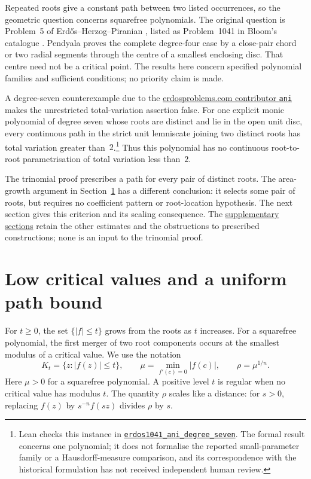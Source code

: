 \documentclass[11pt]{article}
\begin{document}
Repeated roots give a constant path between two listed occurrences, so the
geometric question concerns squarefree polynomials.  The original question
is Problem~5 of Erd\H{o}s--Herzog--Piranian \cite[Problem~5, p.~139]{ehp1958},
listed as Problem~1041 in Bloom's catalogue \cite{bloom}.
Pendyala \cite[Theorem~1 and Lemma~1, pp.~1--3]{june2026} proves the
complete degree-four case by a close-pair chord or two radial segments
through the centre of a smallest enclosing disc. That centre need not be
a critical point. The results here concern specified polynomial families
and sufficient conditions; no priority claim is made.

\label{res:ani-degree-seven-counterexample}
A degree-seven counterexample due to the
\href{https://www.erdosproblems.com/1041}{erdosproblems.com contributor \texttt{ani}} makes the unrestricted total-variation assertion false.  For
one explicit monic polynomial of degree seven whose roots are distinct and
lie in the open unit disc, every continuous path in the strict unit lemniscate
joining two distinct roots has total variation greater than~$2$.\footnote{Lean
checks this instance in
\href{https://github.com/wcook04/plectis-erdos/blob/f70679d47178bf1174309cb29f5b31748609cc04/lean/ErdosProblems/Erdos1041/Counterexample/CatalogueAdapter.lean\#L25}{\texttt{erdos1041\_ani\_degree\_seven}}.
The formal result concerns one polynomial; it does not formalise the reported
small-parameter family or a Hausdorff-measure comparison, and its correspondence
with the historical formulation has not received independent human review.}
Thus this polynomial has no continuous root-to-root parametrisation of total variation less than~$2$.

The trinomial proof prescribes a path for every pair of distinct roots.
The area-growth argument in Section~\ref{sec:constant-factor} has a
different conclusion: it selects some pair of roots, but requires no
coefficient pattern or root-location hypothesis. The next section gives
this criterion and its scaling consequence. The
\hyperlink{supplementary-results}{supplementary sections} retain the
other estimates and the obstructions to prescribed constructions;
none is an input to the trinomial proof.

\section{Low critical values and a uniform path bound}
\label{sec:constant-factor}

For $t\ge0$, the set $\{|f|\le t\}$ grows from the roots as $t$ increases.
For a squarefree polynomial, the first merger of two root components occurs
at the smallest modulus of a critical value. We use the notation
\[
 K_t=\{z:|f(z)|\le t\},\qquad
 \mu=\min_{f'(c)=0}|f(c)|,\qquad \rho=\mu^{1/n}.
\]
Here $\mu>0$ for a squarefree polynomial. A positive level $t$ is
regular when no critical value has modulus $t$. The quantity $\rho$ scales
like a distance: for $s>0$, replacing $f(z)$ by $s^{-n}f(sz)$ divides
$\rho$ by $s$.
\end{document}
